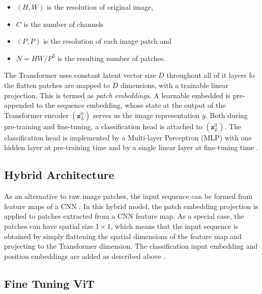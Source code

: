 \documentclass[12pt, a4paper]{report}
\begin{document}
\begin{itemize}
    \item $(H, W)$ is the resolution of original image,
    \item $C$ is the number of channels
    \item $(P, P)$ is the resolution of each image patch and
    \item $N = HW/P^2$ is the resulting number of patches.
\end{itemize}

The Transformer uses constant latent vector size $D$ throughout all of it layers fo the flatten patches are mapped to $D$ dimensions, with a trainable linear projection. This is termed as \emph{patch embeddings}. A learnable embedded is pre-appended to the sequence embedding, whose state at the output of the Transformer encoder $(\textbf{z}_L^0)$ serves as the image representation $y$. Both during pre-training and fine-tuning, a classification head is attached to $(\textbf{z}_L^0)$. The classification head is implemented by a Multi-layer Perceptron (MLP) with one hidden layer at pre-training time and by a single linear layer at fine-tuning time \cite{2020arXiv201011929D}.

\subsection{Hybrid Architecture}
\label{subsec:hybrdarch}

\hspace{0.5cm} As an alternative to raw image patches, the input sequence can be formed from feature maps of a CNN \cite{art:ieee:backprophzcr}. In this hybrid model, the patch embedding projection is applied to patches extracted from a CNN feature map. As a special case, the patches can have spatial size $1\times 1$, which means that the input sequence is obtained by simply flattening the spatial dimensions of the feature map and projecting to the Transformer dimension. The classification input embedding and position embeddings are added as described above \cite{2020arXiv201011929D}.

\subsection{Fine Tuning ViT}
\label{subsec:finevit}
\end{document}
